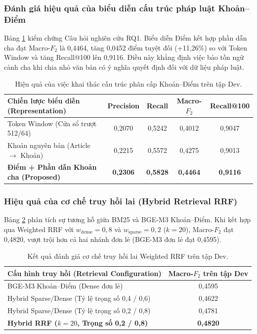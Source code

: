 \documentclass[12pt,a4paper]{article}
\begin{document}
\subsubsection{Đánh giá hiệu quả của biểu diễn cấu trúc pháp luật Khoản--Điểm}
Bảng \ref{tab:structure_results} kiểm chứng Câu hỏi nghiên cứu RQ1. Biểu diễn Điểm kết hợp phần dẫn cha đạt Macro-$F_2$ là 0,4464, tăng 0,0452 điểm tuyệt đối (+11,26\%) so với Token Window và tăng Recall@100 lên 0,9116. Điều này khẳng định việc bảo tồn ngữ cảnh cha khi chia nhỏ văn bản có ý nghĩa quyết định đối với dữ liệu pháp luật.

\begin{table}[htbp]
\centering
\caption{Hiệu quả của việc khai thác cấu trúc phân cấp Khoản--Điểm trên tập Dev.}
\label{tab:structure_results}
\footnotesize
\begin{tabularx}{\textwidth}{X c c c c}
\toprule
\textbf{Chiến lược biểu diễn (Representation)} & \textbf{Precision} & \textbf{Recall} & \textbf{Macro-$F_2$} & \textbf{Recall@100} \\
\midrule
Token Window (Cửa sổ trượt 512/64) & 0,2070 & 0,5242 & 0,4012 & 0,9047 \\
Khoản nguyên bản (Article $\rightarrow$ Khoản) & 0,2215 & 0,5572 & 0,4275 & 0,9013 \\
\textbf{Điểm + Phần dẫn Khoản cha (Proposed)} & \textbf{0,2306} & \textbf{0,5828} & \textbf{0,4464} & \textbf{0,9116} \\
\bottomrule
\end{tabularx}
\end{table}

\subsubsection{Hiệu quả của cơ chế truy hồi lai (Hybrid Retrieval RRF)}
Bảng \ref{tab:hybrid_results} phân tích sự tương hỗ giữa BM25 và BGE-M3 Khoản--Điểm. Khi kết hợp qua Weighted RRF với $w_{\text{dense}} = 0,8$ và $w_{\text{sparse}} = 0,2$ ($k = 20$), Macro-$F_2$ đạt 0,4820, vượt trội hơn cả hai nhánh đơn lẻ (BGE-M3 đơn lẻ đạt 0,4595).

\begin{table}[htbp]
\centering
\caption{Kết quả đánh giá cơ chế truy hồi lai Weighted RRF trên tập Dev.}
\label{tab:hybrid_results}
\footnotesize
\begin{tabularx}{\textwidth}{X c}
\toprule
\textbf{Cấu hình truy hồi (Retrieval Configuration)} & \textbf{Macro-$F_2$ trên tập Dev} \\
\midrule
BGE-M3 Khoản--Điểm (Dense đơn lẻ) & 0,4595 \\
Hybrid Sparse/Dense (Tỷ lệ trọng số 0,4 / 0,6) & 0,4622 \\
Hybrid Sparse/Dense (Tỷ lệ trọng số 0,2 / 0,8) & 0,4781 \\
\textbf{Hybrid RRF ($k=20$, Trọng số 0,2 / 0,8)} & \textbf{0,4820} \\
\bottomrule
\end{tabularx}
\end{table}
\end{document}
